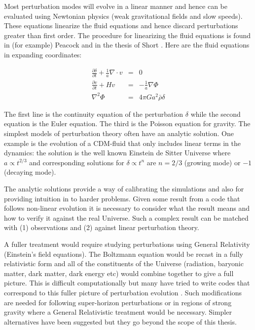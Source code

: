Most perturbation modes will evolve in a linear manner and hence can be evaluated using Newtonian physics (weak gravitational fields and slow speeds). These equations linearize the fluid equations and hence discard perturbations greater than first order. The procedure for linearizing the fluid equations is found in (for example) Peacock \citep{bib_pea} and in the thesis of Short \citep{bib_short}. Here are the fluid equations in  expanding coordinates:

\begin{eqnarray}
\label{eqn_linflu}
\frac{\partial \delta}{\partial t} + \frac{1}{a} \nabla \cdot v &=& 0 \nonumber \\
\frac{\partial v}{\partial t} + H v &=& - \frac{1}{a} \nabla \Phi \nonumber \\
\nabla^2 \Phi &=& 4\pi G a^2 \bar\rho \delta
\end{eqnarray}

The first line is the continuity equation of the perturbation $\delta$ while the second equation is the Euler equation. The third is the Poisson equation for gravity. The simplest models of perturbation theory often have an analytic solution. One example is the evolution of a CDM-fluid that only includes linear terms in the dynamics: the solution is the well known Einstein de Sitter Universe where $ a \propto t^{2/3}$ and corresponding solutions for $\delta \propto t^n$ are $n = 2/3$ (growing mode) or $-1$ (decaying mode).

The analytic solutions provide a way of calibrating the simulations and also for providing intuition in to harder problems. Given some result from a code that follows non-linear evolution it is necessary to consider what the result means and how to verify it against the real Universe. Such a complex result can be matched with (1) observations and (2) against linear perturbation theory.

A fuller treatment would require studying perturbations using General Relativity (Einstein's field equations). The Boltzmann equation would be recast in a fully relativistic form and all of the constituents of the Universe (radiation, baryonic matter, dark matter, dark energy etc) would combine together to give a full picture. This is difficult computationally but many have tried to write codes that correspond to this fuller picture of perturbation evolution \citep{bib_huw, bib_pea}. Such modifications are needed for following super-horizon perturbations or in regions of strong gravity where a General Relativistic treatment would be necessary. Simpler alternatives have been suggested but they go beyond the scope of this thesis.


